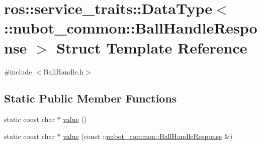 \hypertarget{structros_1_1service__traits_1_1DataType_3_01_1_1nubot__common_1_1BallHandleResponse_01_4}{\section{ros\-:\-:service\-\_\-traits\-:\-:Data\-Type$<$ \-:\-:nubot\-\_\-common\-:\-:Ball\-Handle\-Response $>$ Struct Template Reference}
\label{structros_1_1service__traits_1_1DataType_3_01_1_1nubot__common_1_1BallHandleResponse_01_4}
}


{\ttfamily \#include $<$Ball\-Handle.\-h$>$}

\subsection*{Static Public Member Functions}
\begin{DoxyCompactItemize}
\item 
static const char $\ast$ \hyperlink{structros_1_1service__traits_1_1DataType_3_01_1_1nubot__common_1_1BallHandleResponse_01_4_aebd196780a3e4aced6e67c9dd6baa686}{value} ()
\item 
static const char $\ast$ \hyperlink{structros_1_1service__traits_1_1DataType_3_01_1_1nubot__common_1_1BallHandleResponse_01_4_aeb75f1f77cc78e1ae8d1c5ae90af2e93}{value} (const \-::\hyperlink{namespacenubot__common_a794ba6eb699c7139e7256886a99845bb}{nubot\-\_\-common\-::\-Ball\-Handle\-Response} \&)
\end{DoxyCompactItemize}


